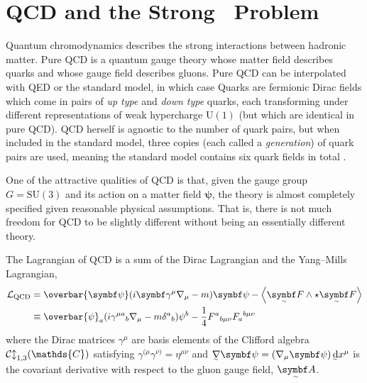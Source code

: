 \section{QCD and the Strong \CP\ Problem}

Quantum chromodynamics describes the strong interactions between hadronic matter.
Pure QCD is a quantum gauge theory whose matter field describes quarks and whose gauge field describes gluons.
Pure QCD can be interpolated with QED or the standard model, in which case 
Quarks are fermionic Dirac fields which come in pairs of \emph{up type} and \emph{down type} quarks, each transforming under different representations of weak hypercharge $\mathrm{U}(1)$ (but which are identical in pure QCD).
QCD herself is agnostic to the number of quark pairs, but when included in the standard model, three copies (each called a \emph{generation}) of quark pairs are used, meaning the standard model contains six quark fields in total . 

One of the attractive qualities of QCD is that, given the gauge group $G = \mathrm{SU}(3)$ and its action on a matter field $\bm\psi$, the theory is almost completely specified given reasonable physical assumptions.
That is, there is not much freedom for QCD to be slightly different without being an essentially different theory.

The Lagrangian of QCD is a sum of the Dirac Lagrangian and the Yang--Mills Lagrangian,
\begin{align}
	\cal L_\text{QCD} &= \overbar{\bm\psi}\qty(i\bm\gamma^\mu\nabla_\mu - m)\bm\psi - \ang{\tsbm F \wedge\star \tsbm F}
\\	&\equiv \overbar{\psi}_a\qty(i\gamma^{\mu a}{}_b\nabla_\mu - m\delta^a{}_b)\psi^b - \frac14F^a{}_{b\mu\nu}F_a{}^{b\mu\nu}
\end{align}
where the Dirac matrices $\gamma^\mu$ are basis elements of the Clifford algebra $\cal{Cl}_{1,3}(\mathds{C})$ satisfying
$\gamma^{(\mu}\gamma^{\nu)} = \eta^{\mu\nu}$ and $\ts\nabla\bm\psi = (\nabla_\mu\bm\psi) \, \ts\dd x^\mu$ is the covariant derivative with respect to the gluon gauge field, $\tsbm A$.


